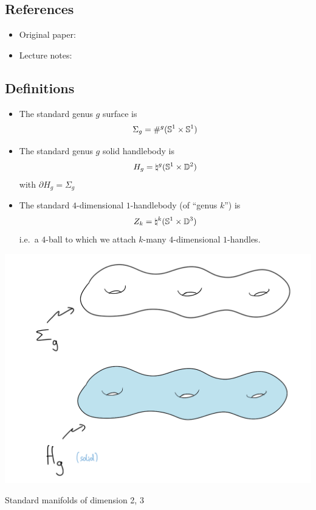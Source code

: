 \subsection{References}

\begin{itemize}
	\item Original paper: \citep{gay2016trisecting}
	\item Lecture notes: \citep{gay2019heegaard}
\end{itemize}

\subsection{Definitions}

\begin{definition}
	\begin{itemize}
		\item The standard genus $g$ surface is
		\[
			\Sigma_g = {\#}^{g} (\mathbb{S}^{1} \times \mathbb{S}^{1})
		\]
		\item The standard genus $g$ solid handlebody is
		\[
			H_g = \natural^g (\mathbb{S}^{1} \times \mathbb{D}^{2})
		\]
		with $\partial H_{g} = \Sigma_{g}$
		
		\item The standard $4$-dimensional $1$-handlebody
		(of ``genus $k$'') is
		\[
			Z_{k} =\natural^{k} (\mathbb{S}^{1} \times \mathbb{D}^{3})
		\]
		i.e.\ a $4$-ball to which we attach $k$-many
		$4$-dimensional $1$-handles.
	\end{itemize}
\end{definition}
\begin{marginfigure}
	\begin{center}
		\includegraphics{./pictures/standard_manifolds.png}
	\end{center}
	\caption{Standard manifolds of dimension 2, 3}
	\label{fig:standard_manifolds}
\end{marginfigure}